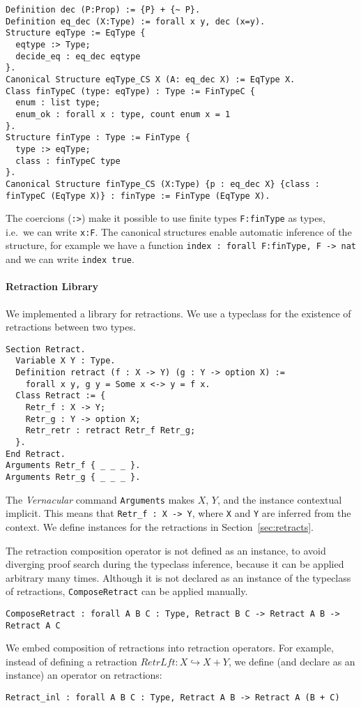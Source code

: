 \begin{lstlisting}
Definition dec (P:Prop) := {P} + {~ P}.
Definition eq_dec (X:Type) := forall x y, dec (x=y).
Structure eqType := EqType {
  eqtype :> Type;
  decide_eq : eq_dec eqtype
}.
Canonical Structure eqType_CS X (A: eq_dec X) := EqType X.
Class finTypeC (type: eqType) : Type := FinTypeC {
  enum : list type;
  enum_ok : forall x : type, count enum x = 1
}.
Structure finType : Type := FinType {
  type :> eqType;
  class : finTypeC type
}.
Canonical Structure finType_CS (X:Type) {p : eq_dec X} {class : finTypeC (EqType X)} : finType := FinType (EqType X).
\end{lstlisting}%

The coercions (\lstinline!:>!) make it possible to use finite types \lstinline{F:finType} as types, i.e.\ we can write \lstinline!x:F!.  The canonical
structures enable automatic inference of the structure, for example we have a function \lstinline!index : forall F:finType, F -> nat! and we can write
\lstinline!index true!.

\paragraph{Retraction Library}

We implemented a library for retractions.  We use a typeclass for the existence of retractions between two types.
\begin{lstlisting}
Section Retract.
  Variable X Y : Type.
  Definition retract (f : X -> Y) (g : Y -> option X) :=
    forall x y, g y = Some x <-> y = f x.
  Class Retract := {
    Retr_f : X -> Y;
    Retr_g : Y -> option X;
    Retr_retr : retract Retr_f Retr_g;
  }.
End Retract.
Arguments Retr_f { _ _ _ }.
Arguments Retr_g { _ _ _ }.
\end{lstlisting}
The \textit{Vernacular} command \lstinline!Arguments! makes $X$, $Y$, and the instance contextual implicit.  This means that
\lstinline!Retr_f : X -> Y!, where \lstinline!X! and \lstinline!Y! are inferred from the context.  We define instances for the retractions in
Section~\ref{sec:retracts}.

The retraction composition operator is not defined as an instance, to avoid diverging proof search during the typeclass inference, because it can be
applied arbitrary many times.  Although it is not declared as an instance of the typeclass of retractions, \lstinline!ComposeRetract! can be applied
manually.
\begin{lstlisting}
ComposeRetract : forall A B C : Type, Retract B C -> Retract A B -> Retract A C
\end{lstlisting}
We embed composition of retractions into retraction operators.  For example, instead of defining a retraction $RetrLft : X \hookrightarrow X+Y$, we
define (and declare as an instance) an operator on retractions:
\begin{lstlisting}
Retract_inl : forall A B C : Type, Retract A B -> Retract A (B + C)
\end{lstlisting}


